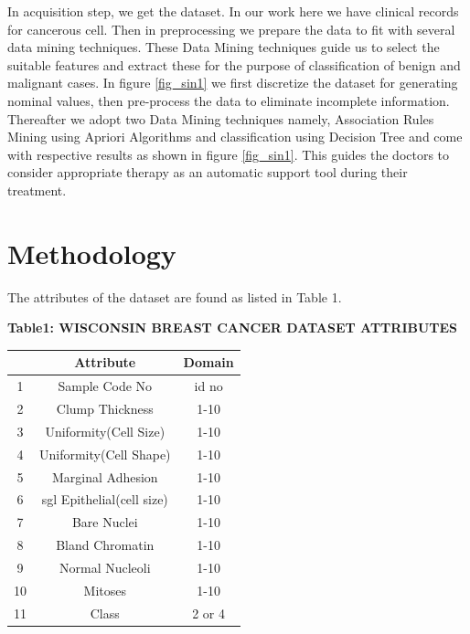 \documentclass[conference]{IEEEtran}
\begin{document}
In acquisition step, we get the dataset. In our work here we have clinical records for cancerous cell. Then in preprocessing we prepare the data to fit with several data mining techniques. These Data Mining techniques guide us to select the suitable features and extract these for the purpose of classification of benign and malignant cases. In figure \ref{fig_sin1}  we first discretize the dataset for generating nominal values, then pre-process the data to eliminate incomplete information. Thereafter we adopt two Data Mining techniques namely, Association Rules Mining using Apriori Algorithms and classification using Decision Tree and come with respective results as shown in figure \ref{fig_sin1}. This guides the doctors to consider appropriate therapy as an automatic support tool during their treatment.

\section{Methodology}
The attributes of the dataset are found as listed in Table 1.
\vspace{.3 cm}

 \begin{center}
     \textbf{Table1: WISCONSIN BREAST CANCER DATASET ATTRIBUTES}
  \end{center}

    \begin{tabular}{|c|c|c|}
      \hline
      & Attribute & Domain\\
      \hline
      1 & Sample Code No & id no\\
      \hline
      2 & Clump Thickness & 1-10\\
      \hline
      3 & Uniformity(Cell Size) & 1-10\\
      \hline
      4 & Uniformity(Cell Shape) & 1-10\\
       \hline
      5 & Marginal Adhesion & 1-10\\
       \hline
      6 & sgl Epithelial(cell size) & 1-10\\
       \hline
      7 & Bare Nuclei & 1-10\\
       \hline
      8  & Bland Chromatin & 1-10\\
       \hline
      9 & Normal Nucleoli & 1-10\\
       \hline
      10 & Mitoses & 1-10\\
       \hline
      11 & Class & 2 or 4\\
      \hline
    \end{tabular}
\end{document}
